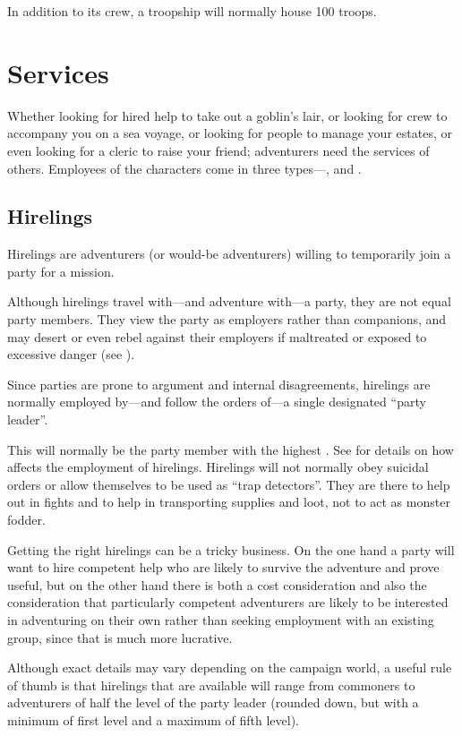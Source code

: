 \begin{multicols*}{2}
In addition to its crew, a troopship will normally house 100 troops.

\section{Services}
Whether looking for hired help to take out a goblin’s lair, or looking for crew to accompany you on a sea voyage, or looking for people to manage your estates, or even looking for a cleric to raise your friend; adventurers need the services of others. Employees of the characters come in three types—,  and .

\subsection{Hirelings}\label{sec:Hirelings}
Hirelings are adventurers (or would-be adventurers) willing to temporarily join a party for a mission.

Although hirelings travel with—and adventure with—a party, they are not equal party members. They view the party as employers rather than companions, and may desert or even rebel against their employers if maltreated or exposed to excessive danger (see ).

Since parties are prone to argument and internal disagreements, hirelings are normally employed by—and follow the orders of—a single designated “party leader”.

This will normally be the party member with the highest . See  for details on how  affects the employment of hirelings. Hirelings will not normally obey suicidal orders or allow themselves to be used as “trap detectors”. They are there to help out in fights and to help in transporting supplies and loot, not to act as monster fodder.

Getting the right hirelings can be a tricky business. On the one hand a party will want to hire competent help who are likely to survive the adventure and prove useful, but on the other hand there is both a cost consideration and also the consideration that particularly competent adventurers are likely to be interested in adventuring on their own rather than seeking employment with an existing group, since that is much more lucrative.

Although exact details may vary depending on the campaign world, a useful rule of thumb is that hirelings that are available will range from commoners to adventurers of half the level of the party leader (rounded down, but with a minimum of first level and a maximum of fifth level).


\end{multicols*}
